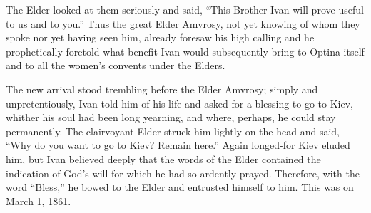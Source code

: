 The Elder looked at them seriously and said, “This Brother Ivan will prove useful to us and to you.” Thus the great Elder Amvrosy, not yet knowing of whom they spoke nor yet having seen him, already foresaw his high calling and he prophetically foretold what benefit Ivan would subsequently bring to Optina itself and to all the women's convents under the Elders.

The new arrival stood trembling before the Elder Amvrosy; simply and unpretentiously, Ivan told him of his life and asked for a blessing to go to Kiev, whither his soul had been long yearning, and where, perhaps, he could stay permanently. The clairvoyant Elder struck him lightly on the head and said, “Why do you want to go to Kiev? Remain here.” Again longed-for Kiev eluded him, but Ivan believed deeply that the words of the Elder contained the indication of God's will for which he had so ardently prayed. Therefore, with the word “Bless,” he bowed to the Elder and entrusted himself to him. This was on March 1, 1861.